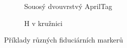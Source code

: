 \begin{figure}
\begin{subfigure}[t]{0.2\textwidth}
          \caption{Souosý dvouvrstvý AprilTag}
          \label{fig:customAprilTag}
        \end{subfigure}
        \hfill
        \begin{subfigure}[t]{0.2\textwidth}
          \centering
          \caption{H v kružnici}
          \label{fig:H}
        \end{subfigure}
        \caption{Příklady různých fiduciárních markerů}
        \label{fig:markery}
      \end{figure}
      